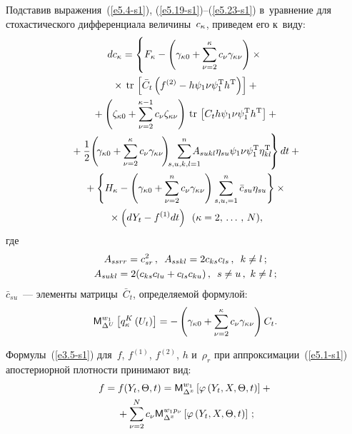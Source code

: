 \begin{multicols}{2}
Подставив выражения~(\ref{e5.4-s1}), (\ref{e5.19-s1})--(\ref{e5.23-s1}) 
в~уравнение для стохастического дифференциала величины~$c_\kappa$, 
приведем его к~виду:
\begin{multline}
dc_\kkk = \left\{ 
\vphantom{\fr{1}{2} 
\left( \gamma_{\kkk 0} +\sss_{\nu=2}^\kkk c_\nu \gamma_{\kkk \nu}
\right) \sss_{s,u,k,l=1}^n A_{sukl} \eta_{su} \psi_1\nu\psi_1^{\mathrm{T}} 
\eta_{kl}^{\mathrm{T}}}
F_\kkk - \left( \gamma_{\kkk 0} +
\sss_{\nu=2}^\kkk c_\nu \gamma_{\kkk \nu}\right)\times{}\right.\\
{}\times    \,\mathrm{tr}\, \lk \bar C_t \left( f^{(2)} - 
    h \psi_1\nu\psi_1^{\mathrm{T}} h^{\mathrm{T}}\right)\rk+{}\\
{}+  \left( \zeta_{\kkk 0} +\sss_{\nu=2}^{\kkk-1} c_\nu \zeta_{\kkk \nu}\right)
    \,\mathrm{tr}\, \lk C_t  h \psi_1\nu\psi_1^{\mathrm{T}} h^{\mathrm{T}}\rk+{}\\
\left.{}+\fr{1}{2} \!
\left( \!\gamma_{\kkk 0} +\sss_{\nu=2}^\kkk c_\nu \gamma_{\kkk \nu}\!
\right) \!\!\sss_{s,u,k,l=1}^n \!\!\!\!\!\!A_{sukl} \eta_{su} \psi_1\nu\psi_1^{\mathrm{T}} 
\eta_{kl}^{\mathrm{T}}\!
\right\} dt+{}\\
{}+\left\{ H_\kkk -\left( \gamma_{\kkk 0} +\sss_{\nu=2}^n c_\nu \gamma_{\kkk \nu}
\right) \sss_{s,u,=1}^n \bar c_{su} \eta_{su} \right\}\times{}\\
{}\times 
\left(dY_t - f^{(1)} dt\right)\enskip
(\kkk = 2\tr N),
\label{e5.24-s1}
\end{multline}
где
\begin{gather*}
A_{ssrr} = c_{sr}^2\,,\enskip A_{sskl} = 2c_{ks}c_{ls}\,,\enskip k\ne l\,;\\
A_{sukl} = 2(c_{ks}c_{lu} + c_{ls} c_{ku})\,,\enskip s\ne u\,,\ 
k\ne l\,;
\end{gather*}
$\bar c_{su}$~--- элементы матрицы~$\bar C_t$, определяемой
формулой:
\begin{equation*}
{\sf M}_{\Delta^U}^{w_1 }\left[ q_\kappa^K \left(U_t\right) \right] =
-  \left( \gamma_{\kappa 0} +\sum\limits_{\nu=2}^\kappa c_\nu \gamma_{\kappa \nu}\right)C_t.
\end{equation*}

Формулы~(\ref{e3.5-s1}) для~$f$, $f^{(1)}$, $f^{(2)}$, 
$h$ и~$\rho_r$ при аппроксимации~(\ref{e5.1-s1}) апостериорной плот\-ности
принимают вид:
\begin{multline}
f= f(Y_t,\Theta,t) = {\sf M}_{\Delta^x}^{w_1} \left[ 
\varphi\left(Y_t, X,\Theta, t\right)\right]+ {}\\
{}+
\sum\limits_{\nu=2}^N c_\nu {\sf M}_{\Delta^x}^{w_1 p_\nu}\left[ 
\varphi\left(Y_t, X,\Theta,t\right)\right]\,;
\label{e5.27-s1}
\end{multline}


\end{multicols}
